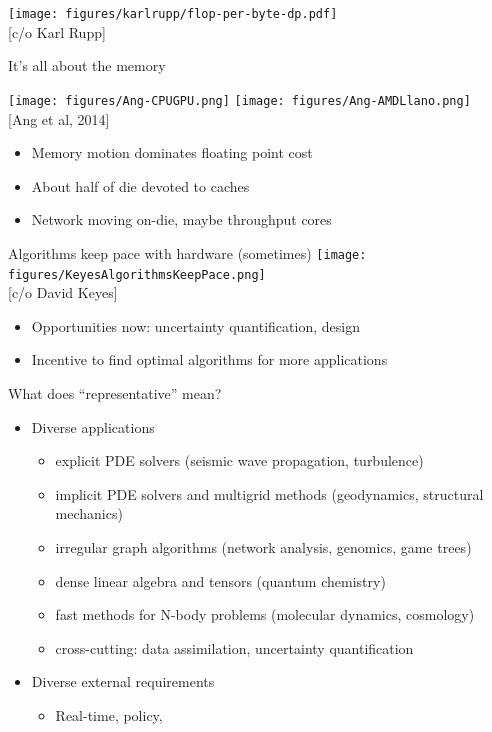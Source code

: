 \documentclass{beamer}
\begin{document}
\begin{frame}
  \texttt{[image: figures/karlrupp/flop-per-byte-dp.pdf]} \\
  {\scriptsize [c/o Karl Rupp]}
\end{frame}

\begin{frame}{It's all about the memory}
  \begin{center}
    \texttt{[image: figures/Ang-CPUGPU.png]}
    \texttt{[image: figures/Ang-AMDLlano.png]} \\
    {\scriptsize [Ang et al, 2014]}
  \end{center}
  \begin{itemize}
  \item Memory motion dominates floating point cost
  \item About half of die devoted to caches
  \item Network moving on-die, maybe throughput cores
  \end{itemize}
\end{frame}

\begin{frame}{Algorithms keep pace with hardware (sometimes)}
  \texttt{[image: figures/KeyesAlgorithmsKeepPace.png]} \\
  {\scriptsize [c/o David Keyes]}
  \begin{itemize}
  \item Opportunities now: uncertainty quantification, design
  \item Incentive to find optimal algorithms for more applications
  \end{itemize}
\end{frame}

\begin{frame}{What does ``representative'' mean?}
  \begin{itemize}
  \item Diverse applications
    \begin{itemize}
    \item explicit PDE solvers (seismic wave propagation, turbulence)
    \item implicit PDE solvers and multigrid methods (geodynamics, structural mechanics)
    \item irregular graph algorithms (network analysis, genomics, game trees) 
    \item dense linear algebra and tensors (quantum chemistry) 
    \item fast methods for N-body problems (molecular dynamics, cosmology) 
    \item cross-cutting: data assimilation, uncertainty quantification
    \end{itemize}
  \item Diverse external requirements
    \begin{itemize}
    \item Real-time, policy, 
    \end{itemize}
  \end{itemize}
\end{frame}
\end{document}
